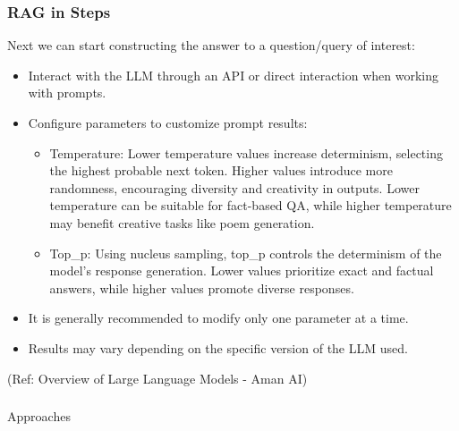 \begin{frame}[fragile]\frametitle{RAG in Steps}

Next we can start constructing the answer to a question/query of interest:

\begin{itemize}
\item Interact with the LLM through an API or direct interaction when working with prompts.
\item Configure parameters to customize prompt results:

\begin{itemize}
\item Temperature: Lower temperature values increase determinism, selecting the highest probable next token. Higher values introduce more randomness, encouraging diversity and creativity in outputs. Lower temperature can be suitable for fact-based QA, while higher temperature may benefit creative tasks like poem generation.
\item Top\_p: Using nucleus sampling, top\_p controls the determinism of the model's response generation. Lower values prioritize exact and factual answers, while higher values promote diverse responses.
\end{itemize}

\item It is generally recommended to modify only one parameter at a time.
\item Results may vary depending on the specific version of the LLM used.
\end{itemize}

{\tiny (Ref: Overview of Large Language Models - Aman AI)}

\end{frame}

\begin{frame}[fragile]\frametitle{}
\begin{center}
{\Large Approaches}
\end{center}
\end{frame}



